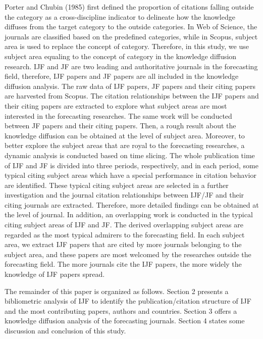 \documentclass[11pt,a4paper]{elsarticle} %
\begin{document}
Porter and Chubin (1985) first defined the proportion of citations
falling outside the category as a cross-discipline indicator to
delineate how the knowledge diffuses from the target category to the
outside categories. In Web of Science, the journals are classified based
on the predefined categories, while in Scopus, subject area is used to
replace the concept of category. Therefore, in this study, we use
subject area equaling to the concept of category in the knowledge
diffusion research. IJF and JF are two leading and authoritative
journals in the forecasting field, therefore, IJF papers and JF papers
are all included in the knowledge diffusion analysis. The raw data of
IJF papers, JF papers and their citing papers are harvested from Scopus.
The citation relationships between the IJF papers and their citing
papers are extracted to explore what subject areas are most interested
in the forecasting researches. The same work will be conducted between
JF papers and their citing papers. Then, a rough result about the
knowledge diffusion can be obtained at the level of subject area.
Moreover, to better explore the subject areas that are royal to the
forecasting researches, a dynamic analysis is conducted based on time
slicing. The whole publication time of IJF and JF is divided into three
periods, respectively, and in each period, some typical citing subject
areas which have a special performance in citation behavior are
identified. These typical citing subject areas are selected in a further
investigation and the journal citation relationships between IJF/JF and
their citing journals are extracted. Therefore, more detailed findings
can be obtained at the level of journal. In addition, an overlapping
work is conducted in the typical citing subject areas of IJF and JF. The
derived overlapping subject areas are regarded as the most typical
admirers to the forecasting field. In each subject area, we extract IJF
papers that are cited by more journals belonging to the subject area,
and these papers are most welcomed by the researches outside the
forecasting field. The more journals cite the IJF papers, the more
widely the knowledge of IJF papers spread.

The remainder of this paper is organized as follows. Section 2 presents
a bibliometric analysis of IJF to identify the publication/citation
structure of IJF and the most contributing papers, authors and
countries. Section 3 offers a knowledge diffusion analysis of the
forecasting journals. Section 4 states some discussion and conclusion of
this study.
\end{document}
